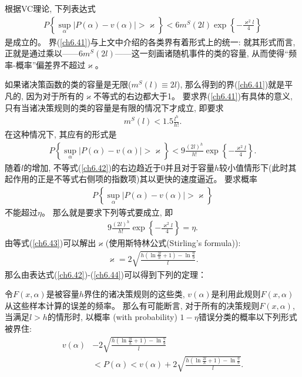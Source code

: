 根据VC理论, 下列表达式
\begin{align}\label{ch6.41}
P\left\{\sup _{\alpha}|P(\alpha)-v(\alpha)|>\varkappa\right\}<6 m^{S}(2 l) \exp \left\{-\frac{\varkappa^{2} l}{4}\right\}
\end{align}
是成立的。 界(\ref{ch6.41})与上文中介绍的各类界有着形式上的统一: 就其形式而言, 正就是通过乘以——$6m^{S}(2l)$——这一刻画诸随机事件的类的容量, 从而使得“频率-概率”偏差界不超过$\varkappa$。

如果诸决策函数的类的容量是无限($m^{S}(l) \equiv 2l$), 那么得到的界(\ref{ch6.41})就是平凡的, 因为对于所有的$\varkappa$不等式的右边都大于1。 要求界(\ref{ch6.41})有具体的意义, 只有当诸决策规则的类的容量是有限的情况下才成立, 即要求
\begin{align}
m^{S}(l)<1.5 \frac{l^{h}}{h !}.
\end{align}
在这种情况下, 其应有的形式是
\begin{align}\label{ch6.42}
P\left\{\sup _{\alpha}|P(\alpha)-v(\alpha)|>\varkappa\right\}<9 \frac{(2 l)^{h}}{h !} \exp \left\{-\frac{\varkappa^{2} l}{4}\right\}.
\end{align}
随着$l$的增加, 不等式(\ref{ch6.42})的右边趋近于0并且对于容量$h$较小值情形下(此时其起作用的正是不等式右侧项的指数项)其以更快的速度逼近。 要求概率
\begin{align}
P\left\{\sup _{\alpha}|P(\alpha)-v(\alpha)|>\varkappa\right\}
\end{align}
不能超过$\eta$。 那么就是要求下列等式要成立, 即
\begin{align}\label{ch6.43}
9 \frac{(2 l)^{h}}{h !} \exp \left\{-\frac{\varkappa^{2} l}{4}\right\}=\eta.
\end{align}
由等式(\ref{ch6.43})可以解出$\varkappa$(使用斯特林公式(Stirling's formula)):
\begin{align}\label{ch6.44}
\varkappa=2 \sqrt{\frac{h\left(\ln \frac{2 l}{h}+1\right)-\ln \frac{\eta}{9}}{l}}.
\end{align}
那么由表达式(\ref{ch6.42})-(\ref{ch6.44})可以得到下列的定理：

\begin{theorem}\label{Theorem6.7}\citep{vapnik1998}
令$F(x, \alpha)$是被容量$h$界住的诸决策规则的这些类, $v(\alpha)$是利用此规则$F(x,\alpha)$从这些样本计算的误差的频率。 那么有可能断言, 对于所有的决策规则$F(x,\alpha)$, 当满足$l>h$的情形时, 以概率 (with probability) $1-\eta$错误分类的概率以下列形式被界住:
\begin{equation*}
\begin{aligned}
v(\alpha)&-2 \sqrt{\frac{h\left(\ln \frac{2 l}{h}+1\right)-\ln \frac{\eta}{9}}{l}} \\
&<P(\alpha)<v(\alpha)+2 \sqrt{\frac{h\left(\ln \frac{2 l}{h}+1\right)-\ln \frac{\eta}{9}}{l}}.
\end{aligned}
\end{equation*}
\end{theorem}

